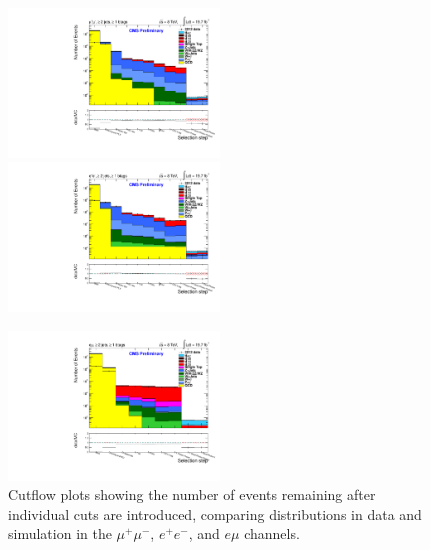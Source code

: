 \begin{figure} 
\includegraphics[width=0.5\textwidth]{Plots/ControlPlots/CutFlow/Log/TTbarMuMuRefSelection_splitTTbar_ratio.pdf}
\includegraphics[width=0.5\textwidth]{Plots/ControlPlots/CutFlow/Log/TTbarEERefSelection_splitTTbar_ratio.pdf} \\
\begin{center}
\includegraphics[width=0.5\textwidth]{Plots/ControlPlots/CutFlow/Log/TTbarEMuRefSelection_splitTTbar_ratio.pdf}
\end{center}
\caption{Cutflow plots showing the number of events remaining after individual cuts are introduced, comparing distributions in data and simulation in the $\mu^{+}\mu^{-}$, $e^{+}e^{-}$, and $e\mu$ channels.}
\label{fig-CutFlow}
\end{figure}

